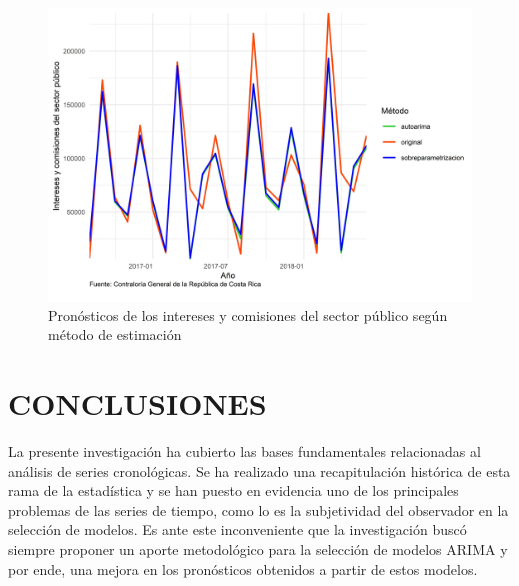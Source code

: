 \documentclass[
]{article}
\begin{document}
\begin{table}[!h]

\caption{\label{tab:unnamed-chunk-22}\label{tab:interesesmedidas}Medidas de rendimiento según método de estimación para los intereses y comisiones del sector público}
\centering
{}
\end{table}

\begin{figure}[!h]
\includegraphics[width=1\linewidth,height=1\textheight]{Tesis_files/figure-latex/interesesplotpronostico-1} \caption{Pronósticos de los intereses y comisiones del sector público según método de estimación}\label{fig:interesesplotpronostico}
\end{figure}

\newpage

\section{CONCLUSIONES}

La presente investigación ha cubierto las bases fundamentales
relacionadas al análisis de series cronológicas. Se ha realizado una
recapitulación histórica de esta rama de la estadística y se han puesto
en evidencia uno de los principales problemas de las series de tiempo,
como lo es la subjetividad del observador en la selección de modelos. Es
ante este inconveniente que la investigación buscó siempre proponer un
aporte metodológico para la selección de modelos ARIMA y por ende, una
mejora en los pronósticos obtenidos a partir de estos modelos.
\end{document}

